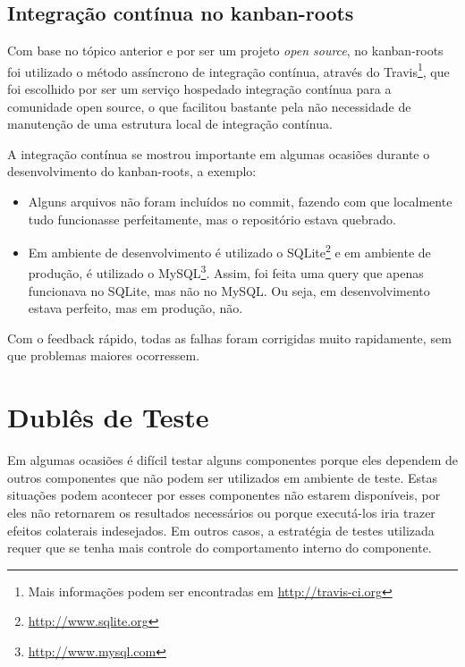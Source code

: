 
\subsection{Integração contínua no kanban-roots} %
\label{sub:integracao_continua_no_kanban}

Com base no tópico anterior e por ser um projeto \textit{open source}, no kanban-roots foi utilizado o método assíncrono de integração contínua, através do Travis\footnote{Mais informações podem ser encontradas em \url{http://travis-ci.org}}, que foi escolhido por ser um serviço hospedado integração contínua para a comunidade open source, o que facilitou bastante pela não necessidade de manutenção de uma estrutura local de integração contínua.

A integração contínua se mostrou importante em algumas ocasiões durante o desenvolvimento do kanban-roots, a exemplo:

\begin{itemize}
  \item Alguns arquivos não foram incluídos no commit, fazendo com que localmente tudo funcionasse perfeitamente, mas o repositório estava quebrado.
  \item Em ambiente de desenvolvimento é utilizado o SQLite\footnote{\url{http://www.sqlite.org}} e em ambiente de produção, é utilizado o MySQL\footnote{\url{http://www.mysql.com}}. Assim, foi feita uma query que apenas funcionava no SQLite, mas não no MySQL. Ou seja, em desenvolvimento estava perfeito, mas em produção, não.
\end{itemize}

Com o feedback rápido, todas as falhas foram corrigidas muito rapidamente, sem que problemas maiores ocorressem.




\section{Dublês de Teste} %
\label{sec:dubles_de_teste}

Em algumas ocasiões é difícil testar alguns componentes porque eles dependem de outros componentes que não podem ser utilizados em ambiente de teste. Estas situações podem acontecer por esses componentes não estarem disponíveis, por eles não retornarem os resultados necessários ou porque executá-los iria trazer efeitos colaterais indesejados. Em outros casos, a estratégia de testes utilizada requer que se tenha mais controle do comportamento interno do componente.


